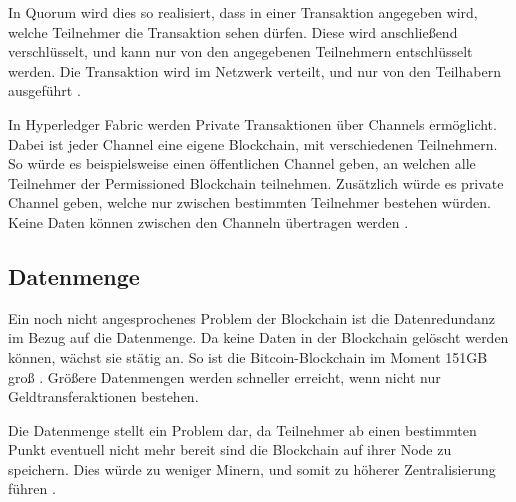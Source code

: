 In Quorum wird dies so realisiert, dass in einer Transaktion angegeben wird, welche Teilnehmer die Transaktion sehen dürfen. Diese wird anschließend verschlüsselt, und kann nur von den angegebenen Teilnehmern entschlüsselt werden. Die Transaktion wird im Netzwerk verteilt, und nur von den Teilhabern ausgeführt \cite{QuorumWikiTransaction2018}.

In Hyperledger Fabric werden Private Transaktionen über Channels ermöglicht. Dabei ist jeder Channel eine eigene Blockchain, mit verschiedenen Teilnehmern. So würde es beispielsweise einen öffentlichen Channel geben, an welchen alle Teilnehmer der Permissioned Blockchain teilnehmen. Zusätzlich würde es private Channel geben, welche nur zwischen bestimmten Teilnehmer bestehen würden. Keine Daten können zwischen den Channeln übertragen werden \cite{SchererPerformanceScalabilityBlockchain2017}. 



\subsection{Datenmenge}
Ein noch nicht angesprochenes Problem der Blockchain ist die Datenredundanz im Bezug auf die Datenmenge. Da keine Daten in der Blockchain gelöscht werden können, wächst sie stätig an. So ist die Bitcoin-Blockchain im Moment 151GB groß \cite{BlockchainSize}. Größere Datenmengen werden schneller erreicht, wenn nicht nur Geldtransferaktionen bestehen.

Die Datenmenge stellt ein Problem dar, da Teilnehmer ab einen bestimmten Punkt eventuell nicht mehr bereit sind die Blockchain auf ihrer Node zu speichern. Dies würde zu weniger Minern, und somit zu höherer Zentralisierung führen \cite{SchererPerformanceScalabilityBlockchain2017}.







